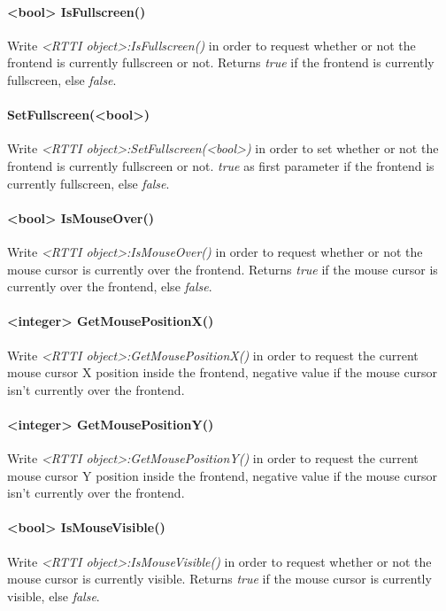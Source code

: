 \paragraph{<bool> IsFullscreen()}
Write \emph{<RTTI object>:IsFullscreen()} in order to request whether or not the frontend is currently fullscreen or not. Returns \emph{true} if the frontend is currently fullscreen, else \emph{false}.

\paragraph{SetFullscreen(<bool>)}
Write \emph{<RTTI object>:SetFullscreen(<bool>)} in order to set whether or not the frontend is currently fullscreen or not. \emph{true} as first parameter if the frontend is currently fullscreen, else \emph{false}.

\paragraph{<bool> IsMouseOver()}
Write \emph{<RTTI object>:IsMouseOver()} in order to request whether or not the mouse cursor is currently over the frontend. Returns \emph{true} if the mouse cursor is currently over the frontend, else \emph{false}.

\paragraph{<integer> GetMousePositionX()}
Write \emph{<RTTI object>:GetMousePositionX()} in order to request the current mouse cursor X position inside the frontend, negative value if the mouse cursor isn't currently over the frontend.

\paragraph{<integer> GetMousePositionY()}
Write \emph{<RTTI object>:GetMousePositionY()} in order to request the current mouse cursor Y position inside the frontend, negative value if the mouse cursor isn't currently over the frontend.

\paragraph{<bool> IsMouseVisible()}
Write \emph{<RTTI object>:IsMouseVisible()} in order to request whether or not the mouse cursor is currently visible. Returns \emph{true} if the mouse cursor is currently visible, else \emph{false}.

